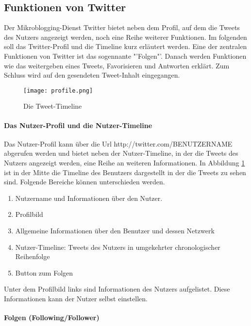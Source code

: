 		\subsection{Funktionen von Twitter}
			
			Der Mikroblogging-Dienst Twitter bietet neben dem Profil, auf dem die Tweets des Nutzers angezeigt werden, noch eine Reihe weiterer Funktionen. 
			Im folgenden soll das Twitter-Profil und die Timeline kurz erläutert werden. 
			Eine der zentralen Funktionen von Twitter ist das sogennante "'Folgen"'.
			Danach werden Funktionen wie das weitergeben eines Tweets, Favorisieren und Antworten erklärt. 
			Zum Schluss wird auf den gesendeten Tweet-Inhalt eingegangen.

			\begin{figure}[h!]
			\begin{center}
			\texttt{[image: profile.png]}
			\caption{Die Tweet-Timeline}
			\label{img:twitterProfile}
			\end{center}
			\end{figure}	


			\paragraph{Das Nutzer-Profil und die Nutzer-Timeline}
				Das Nutzer-Profil kann über die Url http://twitter.com/BENUTZERNAME abgerufen werden und bietet neben der Nutzer-Timeline, in der die Tweets des Nutzers angezeigt werden, eine Reihe an weiteren Informationen.
				In Abbildung \ref{img:twitterProfile} ist in der Mitte die Timeline des Benutzers dargestellt in der die Tweets zu sehen sind. 
				Folgende Bereiche können unterschieden werden.
				\begin{enumerate}
					\item Nutzername und Informationen über den Nutzer. 
					\item Profilbild
					\item Allgemeine Informationen über den Benutzer und dessen Netzwerk
					\item Nutzer-Timeline: Tweets des Nutzers in umgekehrter chronologischer Reihenfolge 
					\item Button zum Folgen
				\end{enumerate}
				
				Unter dem Profilbild links sind Informationen des Nutzers aufgelistet.
				Diese Informationen kann der Nutzer selbst einstellen.   

			\paragraph{Folgen (Following/Follower)}
				
